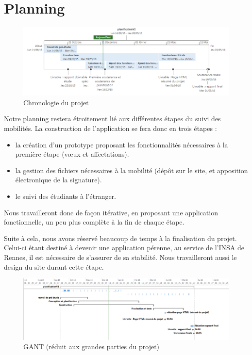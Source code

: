 \section{Planning}
\begin{figure}[H]
	\centering
	\includegraphics[scale=0.7]{images/chrono_planif.png}
	\caption{Chronologie du projet}
\end{figure}

Notre planning restera étroitement lié aux différentes étapes du suivi des mobilités. La construction de l'application se fera donc en trois étapes :
\begin{itemize}
 \item la création d'un prototype proposant les fonctionnalités nécessaires à la première étape (vœux et affectations).
 \item la gestion des fichiers nécessaires à la mobilité (dépôt sur le site, et apposition électronique de la signature).
 \item le suivi des étudiants à l'étranger.
\end{itemize}
Nous travailleront donc de façon itérative, en proposant une application fonctionnelle, un peu plus complète à la fin de chaque étape.


Suite à cela, nous avons réservé beaucoup de temps à la finalisation du projet. Celui-ci étant destiné à devenir une application pérenne, au service de l'INSA de Rennes, il est nécessaire de s'assurer de sa stabilité. Nous travailleront aussi le design du site durant cette étape. 

\begin{figure}[H]
	\centering
	\includegraphics[scale=0.5]{images/gant.PNG}
	\caption{GANT (réduit aux grandes parties du projet)}
\end{figure}

